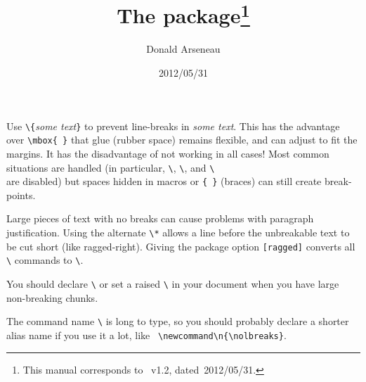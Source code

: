 \documentclass[pagesize=auto, fontsize=14pt, parskip=half]{scrartcl}
\title{The \pkg{nolbreaks} package\thanks{This manual corresponds to 
 \pkg{nolbreaks}~v1.2, dated~2012/05/31.}}
\author{Donald Arseneau}
\date{2012/05/31}
\makeatletter
\newcommand*{\cs}[1]{\texttt{\textbackslash#1}}
\newcommand*{\cmd}[1]{\cs{\expandafter\@gobble\string#1}}
\newcommand*{\opt}[1]{\texttt{#1}}
\newcommand*{\meta}[1]{\textlangle\textsl{#1}\textrangle}
\newcommand*{\marg}[1]{\texttt{\{}\meta{#1}\texttt{\}}}
\makeatother
\begin{document}
\maketitle

Use \cmd{\nolbreaks}\marg{some text} to prevent line-breaks in 
\meta{some text}. This has the advantage over \verb+\mbox{ }+ that 
glue (rubber space) remains flexible, and can adjust to fit the margins.  
It has the disadvantage of not working in all cases!  Most common 
situations are handled (in particular, \cmd{\newline}, \cmd{\linebreak}, 
and \cmd{\\} are disabled) but spaces hidden in macros or \verb+{ }+
(braces) can still create break-points. 

Large pieces of text with no breaks can cause problems with
paragraph justification.   Using the alternate \cmd{\nolbreaks}\verb'*'
allows a line before the unbreakable text to be cut short
(like ragged-right). Giving the package option \opt{[ragged]}
converts all \cmd{\nolbreaks} commands to \cmd{\nolbreaks*}.

You should declare \cmd{\sloppy} or set a raised \cmd{\tolerance} in 
your document when you have large non-breaking chunks.

The command name \cmd{\nolbreaks} is long to type, so you should 
probably declare a shorter alias name if you use it a lot, like
   \  \verb'\newcommand\n{\nolbreaks}'.
\end{document}
